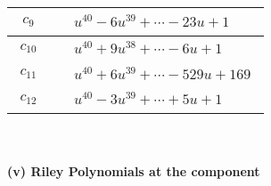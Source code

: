 \documentclass[1p]{elsarticle_modified}
\theoremstyle{definition}
\begin{document}
\begin{tabular}{m{50pt}|m{274pt}}
\hline $$\begin{aligned}c_{9}\end{aligned}$$&$\begin{aligned}
&u^{40}-6 u^{39}+\cdots-23 u+1
\end{aligned}$\\
\hline $$\begin{aligned}c_{10}\end{aligned}$$&$\begin{aligned}
&u^{40}+9 u^{38}+\cdots-6 u+1
\end{aligned}$\\
\hline $$\begin{aligned}c_{11}\end{aligned}$$&$\begin{aligned}
&u^{40}+6 u^{39}+\cdots-529 u+169
\end{aligned}$\\
\hline $$\begin{aligned}c_{12}\end{aligned}$$&$\begin{aligned}
&u^{40}-3 u^{39}+\cdots+5 u+1
\end{aligned}$\\
\hline
\end{tabular}\\~\\
\newpage\renewcommand{\arraystretch}{1}
\flushleft \textbf{(v) Riley Polynomials at the component}\newline \\
\end{document}
